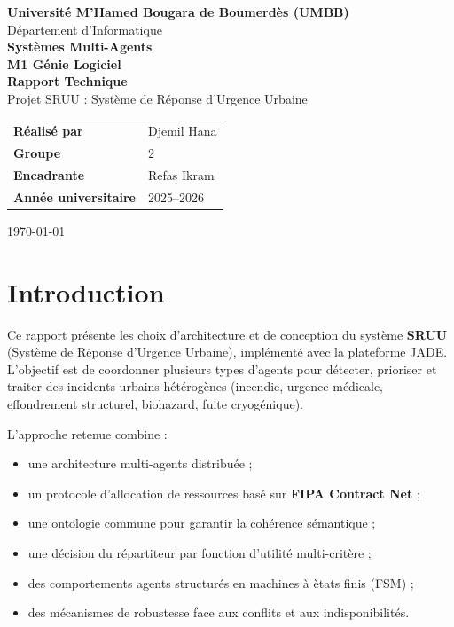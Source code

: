 \documentclass[12pt,a4paper]{article}
\begin{document}
\begin{titlepage}
    \centering

    {\Large \textbf{Universit\'e M'Hamed Bougara de Boumerd\`es (UMBB)}}\\[0.3cm]
    {\large D\'epartement d'Informatique}\\[0.8cm]
    {\large \textbf{Syst\`emes Multi-Agents}}\\[0.2cm]
    {\large \textbf{M1 G\'enie Logiciel}}\\[1.8cm]

    {\LARGE \textbf{Rapport Technique}}\\[0.3cm]
    {\Large Projet SRUU : Syst\`eme de R\'eponse d'Urgence Urbaine}\\[1.6cm]

    \begin{tabular}{>{\bfseries}p{4.5cm}p{8.8cm}}
        R\'ealis\'e par & Djemil Hana \\
        Groupe & 2 \\
        Encadrante & Refas Ikram \\
        Ann\'ee universitaire & 2025--2026 \\
    \end{tabular}

    \vfill
    {\large \today}
\end{titlepage}

\tableofcontents
\newpage

\section{Introduction}
Ce rapport pr\'esente les choix d'architecture et de conception du syst\`eme \textbf{SRUU} (Syst\`eme de R\'eponse d'Urgence Urbaine), impl\'ement\'e avec la plateforme JADE. L'objectif est de coordonner plusieurs types d'agents pour d\'etecter, prioriser et traiter des incidents urbains h\'et\'erog\`enes (incendie, urgence m\'edicale, effondrement structurel, biohazard, fuite cryog\'enique).

L'approche retenue combine :
\begin{itemize}
    \item une architecture multi-agents distribu\'ee ;
    \item un protocole d'allocation de ressources bas\'e sur \textbf{FIPA Contract Net} ;
    \item une ontologie commune pour garantir la coh\'erence s\'emantique ;
    \item une d\'ecision du r\'epartiteur par fonction d'utilit\'e multi-crit\`ere ;
    \item des comportements agents structur\'es en machines \`a \`etats finis (FSM) ;
    \item des m\'ecanismes de robustesse face aux conflits et aux indisponibilit\'es.
\end{itemize}
\end{document}
